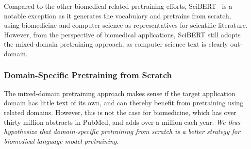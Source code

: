 \documentclass[acmlarge,screen,nonacm]{acmart}
\begin{document}
Compared to the other biomedical-related pretraining efforts, SciBERT~\cite{beltagy2019scibert} is a notable exception as it generates the vocabulary and pretrains from scratch, using biomedicine and computer science as representatives for scientific literature. However, from the perspective of biomedical applications, SciBERT still adopts the mixed-domain pretraining approach, as computer science text is clearly out-domain.

\subsubsection{Domain-Specific Pretraining from Scratch}

The mixed-domain pretraining approach makes sense if the target application domain has little text of its own, and can thereby benefit from pretraining using related domains. 
However, this is not the case for biomedicine, which has over thirty million abstracts in PubMed, and adds over a million each year. 
{\em We thus hypothesize that domain-specific pretraining from scratch is a better strategy for biomedical language model pretraining.}
\end{document}
